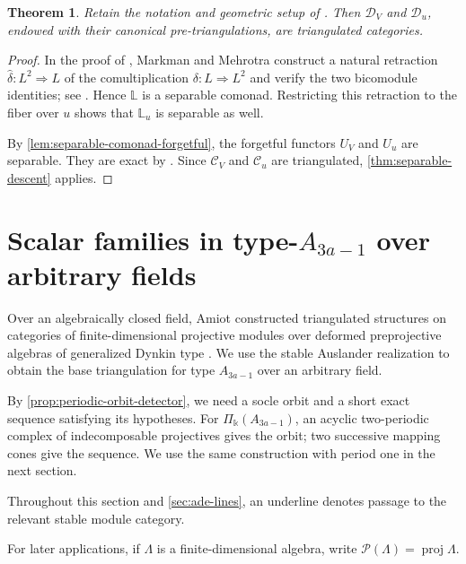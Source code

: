 \documentclass[a4paper,11pt,reqno]{amsart}
\newtheorem{theorem}{Theorem}[section]
\theoremstyle{definition}
\theoremstyle{plain}
\numberwithin{equation}{section}
\newcommand{\C}{\mathcal C}
\newcommand{\D}{\mathcal D}
\newcommand{\kk}{\Bbbk}
\begin{document}
\begin{theorem}
\label{thm:k3-categories}
Retain the notation and geometric setup of
\cite[Theorem~1.8]{MarkmanMehrotra2015}.  Then \(\D_V\) and \(\D_u\),
endowed with their canonical pre-triangulations, are triangulated
categories.
\end{theorem}

\begin{proof}
In the proof of \cite[Theorem~1.8(3)]{MarkmanMehrotra2015}, Markman and
Mehrotra construct a natural retraction
\(\widehat\delta:L^2\Rightarrow L\) of the comultiplication
\(\delta:L\Rightarrow L^2\) and verify the two bicomodule identities; see
\cite[diagram~(6.12) and the subsequent argument]{MarkmanMehrotra2015}.
Hence \(\mathbb L\) is a separable comonad.  Restricting this retraction
to the fiber over \(u\) shows that \(\mathbb L_u\) is separable as well.

By \cref{lem:separable-comonad-forgetful}, the forgetful functors \(U_V\)
and \(U_u\) are separable.  They are exact by
\cite[Theorem~1.8(3)]{MarkmanMehrotra2015}.  Since \(\C_V\) and
\(\C_u\) are triangulated, \cref{thm:separable-descent} applies.
\end{proof}

\section{Scalar families in type-\texorpdfstring{$A_{3a-1}$}{A(3a-1)}
over arbitrary fields}
\label{sec:deformations}

Over an algebraically closed field, Amiot constructed triangulated
structures on categories of finite-dimensional projective modules over
deformed preprojective algebras of generalized Dynkin type
\cite[Theorem~8.1 and Corollary~9.3]{Amiot2007}.  We use the stable
Auslander realization to obtain the base triangulation for type
\(A_{3a-1}\) over an arbitrary field.

By \cref{prop:periodic-orbit-detector}, we need a socle orbit and a short
exact sequence satisfying its hypotheses.  For \(\Pi_\kk(A_{3a-1})\),
an acyclic two-periodic complex of indecomposable projectives gives the
orbit; two successive mapping cones give the sequence.  We use the same
construction with period one in the next section.

Throughout this section and \cref{sec:ade-lines}, an underline denotes
passage to the relevant stable module category.

For later applications, if \(\Lambda\) is a finite-dimensional algebra, write
\(\mathcal P(\Lambda)=\operatorname{proj}\Lambda\).
\end{document}
